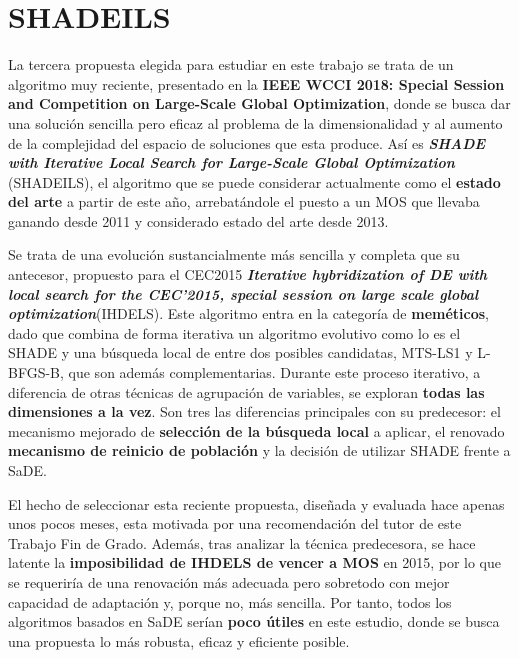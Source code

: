 \section{SHADEILS}

La tercera propuesta elegida para estudiar en este trabajo se trata de un algoritmo muy reciente, presentado en la \textbf{IEEE WCCI 2018: Special Session and Competition on Large-Scale Global Optimization}\cite{WCCI-SHADEILS}, donde se busca dar una solución sencilla pero eficaz al problema de la dimensionalidad y al aumento de la complejidad del espacio de soluciones que esta produce. Así es \textbf{\textit{SHADE with Iterative Local Search for Large-Scale Global Optimization}}\cite{SHADEILS} (SHADEILS), el algoritmo que se puede considerar actualmente como el \textbf{estado del arte} a partir de este año, arrebatándole el puesto a un MOS que llevaba ganando desde 2011 y considerado estado del arte desde 2013.

Se trata de una evolución sustancialmente más sencilla y completa que su antecesor, propuesto para el CEC2015 \textbf{\textit{Iterative hybridization of DE with local search for the CEC'2015, special session on large scale global optimization}}(IHDELS)\cite{IHDELS}. Este algoritmo entra en la categoría de \textbf{meméticos}, dado que combina de forma iterativa un algoritmo evolutivo como lo es el SHADE\cite{SHADE} y una búsqueda local de entre dos posibles candidatas, MTS-LS1\cite{MTS-LSGO} y L-BFGS-B\cite{LBFGSB}, que son además complementarias. Durante este proceso iterativo, a diferencia de otras técnicas de agrupación de variables, se exploran \textbf{todas las dimensiones a la vez}. Son tres las diferencias principales con su predecesor: el mecanismo mejorado de \textbf{selección de la búsqueda local} a aplicar, el renovado \textbf{mecanismo de reinicio de población} y la decisión de utilizar SHADE frente a SaDE\cite{SaDE}.

El hecho de seleccionar esta reciente propuesta, diseñada y evaluada hace apenas unos pocos meses, esta motivada por una recomendación del tutor de este Trabajo Fin de Grado. Además, tras analizar la técnica predecesora, se hace latente la \textbf{imposibilidad de IHDELS de vencer a MOS} en 2015, por lo que se requeriría de una renovación más adecuada pero sobretodo con mejor capacidad de adaptación y, porque no, más sencilla. Por tanto, todos los algoritmos basados en SaDE serían \textbf{poco útiles} en este estudio, donde se busca una propuesta lo más robusta, eficaz y eficiente posible.

